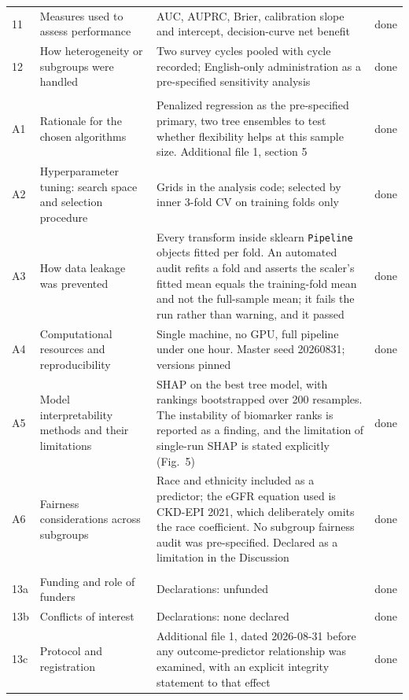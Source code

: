 \documentclass[10pt]{article}
\begin{document}
\begin{longtable}{C{0.7cm}L{4.3cm}L{9cm}C{1.2cm}}
11 & Measures used to assess performance & AUC, AUPRC, Brier, calibration slope and intercept, decision-curve net benefit & done \\
12 & How heterogeneity or subgroups were handled & Two survey cycles pooled with cycle recorded; English-only administration as a pre-specified sensitivity analysis & done \\
\addlinespace
{} \\
A1 & Rationale for the chosen algorithms & Penalized regression as the pre-specified primary, two tree ensembles to test whether flexibility helps at this sample size. Additional file 1, section 5 & done \\
A2 & Hyperparameter tuning: search space and selection procedure & Grids in the analysis code; selected by inner 3-fold CV on training folds only & done \\
A3 & How data leakage was prevented & Every transform inside sklearn \texttt{Pipeline} objects fitted per fold. An automated audit refits a fold and asserts the scaler's fitted mean equals the training-fold mean and not the full-sample mean; it fails the run rather than warning, and it passed & done \\
A4 & Computational resources and reproducibility & Single machine, no GPU, full pipeline under one hour. Master seed 20260831; versions pinned & done \\
A5 & Model interpretability methods and their limitations & SHAP on the best tree model, with rankings bootstrapped over 200 resamples. The instability of biomarker ranks is reported as a finding, and the limitation of single-run SHAP is stated explicitly (Fig.~5) & done \\
A6 & Fairness considerations across subgroups & Race and ethnicity included as a predictor; the eGFR equation used is CKD-EPI 2021, which deliberately omits the race coefficient. No subgroup fairness audit was pre-specified. Declared as a limitation in the Discussion & done \\
\addlinespace
{} \\
13a & Funding and role of funders & Declarations: unfunded & done \\
13b & Conflicts of interest & Declarations: none declared & done \\
13c & Protocol and registration & Additional file 1, dated 2026-08-31 before any outcome-predictor relationship was examined, with an explicit integrity statement to that effect & done \\

\end{longtable}
\end{document}
